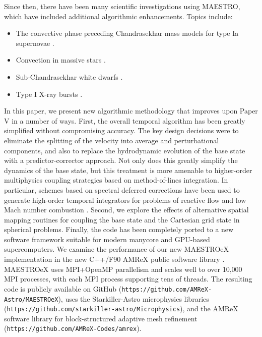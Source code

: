 Since then, there have been many scientific investigations using MAESTRO, which have included additional algorithmic enhancements.  Topics include:
\begin{itemize}
\item The convective phase preceding Chandrasekhar mass models for type Ia supernovae \citep{MAESTRO_convection,MAESTRO_AMR,MAESTRO_CASTRO}.
\item Convection in massive stars \citep{Gilet:2013,gilkis:2016}.
\item Sub-Chandrasekhar white dwarfs \citep{subChandra_I,subChandra_II}.
\item Type I X-ray bursts \citep{XRB_I,XRB_II,XRB_III}.
\end{itemize}

In this paper, we present new algorithmic methodology that improves upon Paper V in a number of ways.
First, the overall temporal algorithm has been greatly simplified without compromising accuracy.
The key design decisions were to eliminate the splitting of the velocity into average and perturbational components, 
and also to replace the hydrodynamic evolution of the base state with a predictor-corrector approach.
Not only does this greatly simplify the dynamics of the base
state, but this treatment is more amenable to higher-order multiphysics coupling strategies
based on method-of-lines integration.  
In particular, schemes based on spectral deferred corrections have been used to generate high-order temporal integrators for problems of reactive flow \citep{dutt2000spectral} and low Mach number combustion \citep{pazner2016high,nonaka2018conservative}.
Second, we explore the effects of alternative spatial mapping routines for coupling the base state and the Cartesian grid state in spherical problems.
Finally, the code has been completely ported to a new software framework suitable for modern manycore and GPU-based supercomputers.
We examine the performance of our new MAESTROeX implementation in the new C++/F90 AMReX public software library \cite{AMReX,AMReX_JOSS}.
MAESTROeX uses MPI+OpenMP parallelism and scales well to over 10,000 MPI processes, with each MPI process supporting tens of threads.
The resulting code is publicly available on GitHub ({\tt https://github.com/AMReX-Astro/MAESTROeX}),
uses the Starkiller-Astro microphysics libraries ({\tt https://github.com/starkiller-astro/Microphysics}),
and the AMReX software library for block-structured adaptive mesh refinement ({\tt https://github.com/AMReX-Codes/amrex}).

